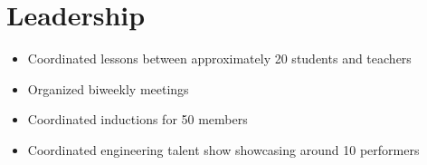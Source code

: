 \documentclass{my_resume}
\begin{document}
\section{Leadership}
    \begin{itemize}
        \item Coordinated lessons between approximately 20 students and teachers
        \item Organized biweekly meetings
    \end{itemize}
    \begin{itemize}
        \item Coordinated inductions for 50 members
    \end{itemize}
    \begin{itemize}
        \item Coordinated engineering talent show showcasing around 10 performers
    \end{itemize}
\end{document}
